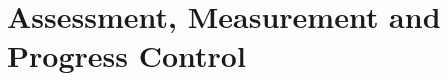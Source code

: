 \documentclass[
    12pt,
    a4paper,
    oneside,
    openany
]{book}
\begin{document}





\part{Assessment, Measurement and Progress Control}

\end{document}
